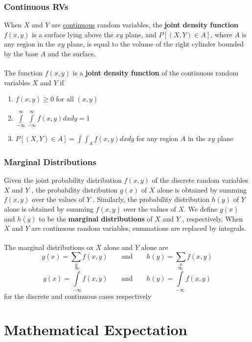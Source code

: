 \documentclass[11pt]{article}
\begin{document}
\subsubsection{Continuous RVs}
When $X$ and $Y$ are \underline{continuous} random variables, the \textbf{joint density function} $f(x,y)$ is a surface lying above the $xy$ plane, and $P[(X,Y) \in A]$, where $A$ is any region in the $xy$ plane, is equal to the volume of the right cylinder bounded by the base $A$ and the surface.
\\ \\ 
The function $f(x,y)$ is a \textbf{joint density function} of the continuous random variables $X$ and $Y$ if 
\begin{enumerate}
\item $f(x,y) \geq 0$ for all $(x,y)$
\item $\int \limits_{-\infty}^{\infty} \int \limits_{-\infty}^{\infty} f(x,y) dx dy = 1$
\item $P[(X, Y) \in A] = \int \int _A f(x,y) dx dy$ for any region $A$ in the $xy$ plane
\end{enumerate}

\pagebreak
\subsubsection{Marginal Distributions}
Given the joint probability distribution $f (x, y)$ of the discrete random variables $X$ and $Y$ , the probability distribution $g(x)$ of $X$ alone is obtained by summing $f (x, y)$ over the values of $Y$ . Similarly, the probability distribution $h(y)$ of $Y$ alone is obtained by summing $f(x,y)$ over the values of $X$. We define $g(x)$ and $h(y)$ to be the \textbf{marginal distributions} of $X$ and $Y$ , respectively. When $X$ and $Y$ are continuous random variables, summations are replaced by integrals. 
\\ \\
The marginal distributions ox $X$ alone and $Y$ alone are
$$ g(x) = \sum \limits _y f(x,y) \quad \quad \text{and} \quad \quad  h(y) = \sum \limits _x f(x,y)$$
$$ g(x) = \int \limits_{-\infty}^{\infty} f(x,y) \quad \quad \text{and} \quad \quad  h(y) = \int \limits_{-\infty}^{\infty} f(x,y)$$
for the discrete and continuous cases respectively

\section{Mathematical Expectation}
\end{document}
